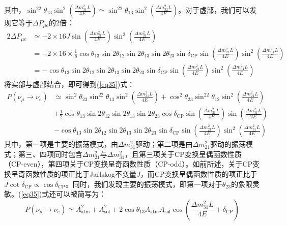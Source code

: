 \documentclass{article}
\begin{document}
	其中，$\sin^22\theta_{13}\sin^2\left(\frac{\Delta m_{31}^2L}{4E}\right)\simeq\sin^22\theta_{13}\sin^2\left(\frac{\Delta m_{32}^2L}{4E}\right)$。对于虚部，我们可以发现它等于$\Delta P_{\mu e}$的2倍：
	\begin{equation*}
		\begin{aligned}
			2\Delta P_{\mu e}&\simeq-2\times16J\sin\left(\frac{\Delta m_{21}^2L}{4E}\right)\sin^2\left(\frac{\Delta m_{31}^2L}{4E}\right)\\
			&=-2\times16\times\frac{1}{8} \cos\theta_{13}\sin2\theta_{12}\sin2\theta_{13}\sin2\theta_{23}\sin\delta_{\mathrm{CP}}\sin\left(\frac{\Delta m_{21}^2L}{4E}\right)\sin^2\left(\frac{\Delta m_{31}^2L}{4E}\right)\\
			&=-\cos\theta_{13}\sin2\theta_{12}\sin2\theta_{13}\sin2\theta_{23}\sin\delta_{\mathrm{CP}}\sin\left(\frac{\Delta m_{21}^2L}{4E}\right)\sin^2\left(\frac{\Delta m_{31}^2L}{4E}\right)
		\end{aligned}
	\end{equation*}
	将实部与虚部结合，即可得到(\ref{eq35})式：
	\begin{equation*}
		\begin{aligned}P(\nu_\mu\to\nu_e)&\simeq\sin^2\theta_{23}\sin^22\theta_{13}\sin^2\left(\frac{\Delta m_{31}^2L}{4E}\right)+\cos^2\theta_{23}\sin^22\theta_{12}\sin^2\left(\frac{\Delta m_{21}^2L}{4E}\right)\\&+\frac{1}{2}\cos\theta_{13}\sin2\theta_{12}\sin2\theta_{13}\sin2\theta_{23}\cos\delta_{\mathrm{CP}}\sin\left(\frac{\Delta m_{21}^2L}{4E}\right)\sin\left(\frac{\Delta m_{31}^2L}{2E}\right)\\&-\cos\theta_{13}\sin2\theta_{12}\sin2\theta_{13}\sin2\theta_{23}\sin\delta_{\mathrm{CP}}\sin\left(\frac{\Delta m_{21}^2L}{4E}\right)\sin^2\left(\frac{\Delta m_{31}^2L}{4E}\right)\end{aligned}
	\end{equation*}
	其中，第一项是主要的振荡模式，由$\Delta m_{31}^2$驱动；第二项是由$\Delta m_{21}^2$驱动的振荡模式；第三、四项同时包含$\Delta m_{21}^2$与$\Delta m_{31}^2$，且第三项关于CP变换呈偶函数性质（CP-even），第四项关于CP变换呈奇函数性质（CP-odd）。如前所述，关于CP变换呈奇函数性质的项正比于Jarlskog不变量$J$，而CP变换呈偶函数性质的项正比于$J\cot\delta_\mathrm{CP}\propto\cos\delta_\mathrm{CP}$。同时，我们发现主要的振荡模式，即第一项对于$\theta_{23}$的象限灵敏。(\ref{eq35})式还可以被简写为：
	\begin{equation}
		P(\nu_\mu\to\nu_e)\simeq A_{\mathrm{atm}}^2+A_{\mathrm{sol}}^2+2\cos\theta_{13}A_{\mathrm{atm}}A_{\mathrm{sol}}\cos\left(\frac{\Delta m_{31}^2L}{4E}+\delta_{\mathrm{CP}}\right)
		\label{eq36}
	\end{equation}
\end{document}
